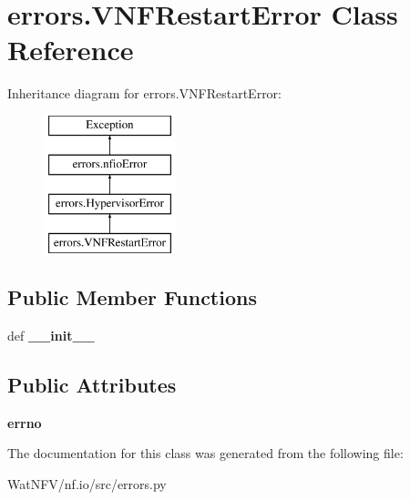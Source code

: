 \hypertarget{classerrors_1_1VNFRestartError}{\section{errors.\-V\-N\-F\-Restart\-Error Class Reference}
\label{classerrors_1_1VNFRestartError}
}
Inheritance diagram for errors.\-V\-N\-F\-Restart\-Error\-:\begin{figure}[H]
\begin{center}
\leavevmode
\includegraphics[height=4.000000cm]{classerrors_1_1VNFRestartError}
\end{center}
\end{figure}
\subsection*{Public Member Functions}
\begin{DoxyCompactItemize}
\item 
\hypertarget{classerrors_1_1VNFRestartError_a4d4c49c81e3d12b08a271f70daeb8d05}{def {\bfseries \-\_\-\-\_\-init\-\_\-\-\_\-}}\label{classerrors_1_1VNFRestartError_a4d4c49c81e3d12b08a271f70daeb8d05}

\end{DoxyCompactItemize}
\subsection*{Public Attributes}
\begin{DoxyCompactItemize}
\item 
\hypertarget{classerrors_1_1VNFRestartError_abf021cdb7d3eb3d6273735b201491c4d}{{\bfseries errno}}\label{classerrors_1_1VNFRestartError_abf021cdb7d3eb3d6273735b201491c4d}

\end{DoxyCompactItemize}


The documentation for this class was generated from the following file\-:\begin{DoxyCompactItemize}
\item 
Wat\-N\-F\-V/nf.\-io/src/errors.\-py\end{DoxyCompactItemize}
